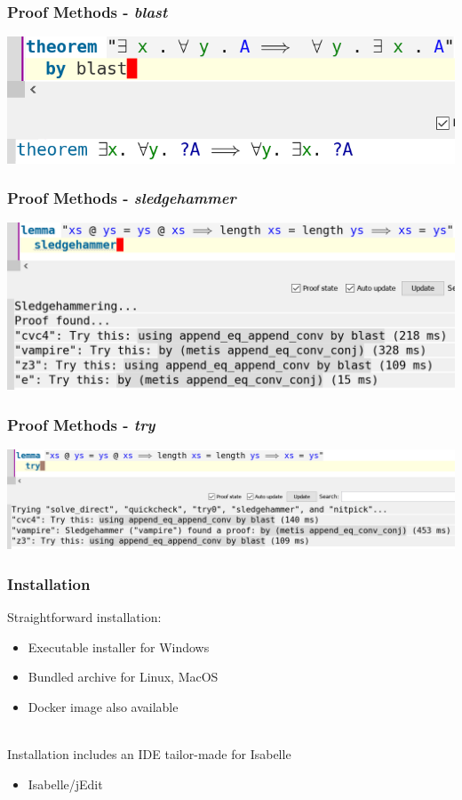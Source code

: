 \documentclass{beamer}
\begin{document}
  \begin{frame}
	\frametitle{Proof Methods - \textit{blast}}
	\centering
	\includegraphics[scale=0.7]{images/blast.png}
  \end{frame}

  \begin{frame}
	\frametitle{Proof Methods - \textit{sledgehammer}}
	\centering
	\includegraphics[scale=0.6]{images/sledgehammer.png}
  \end{frame}

  \begin{frame}
	\frametitle{Proof Methods - \textit{try}}
	\centering
	\includegraphics[scale=0.42]{images/try.png}
  \end{frame}

  \begin{frame}
    \frametitle{Installation}
    Straightforward installation:
    \begin{itemize}
      \item Executable installer for Windows
      \item Bundled archive for Linux, MacOS
      \item Docker image also available\\~\

    \end{itemize}

    Installation includes an IDE tailor-made for Isabelle
    \begin{itemize}
      \item Isabelle/jEdit
    \end{itemize}
  \end{frame}
\end{document}
